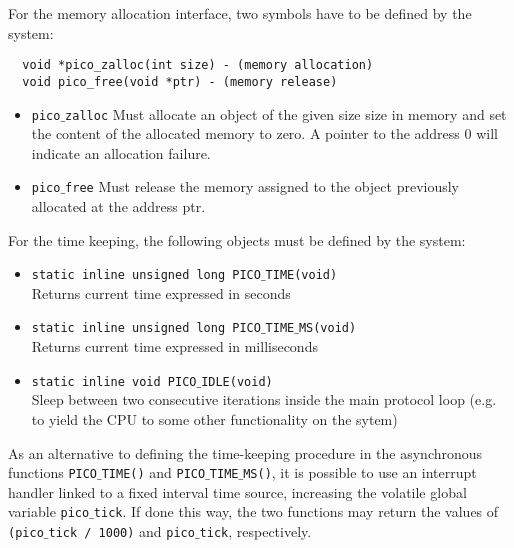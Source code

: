 For the memory allocation interface, two symbols have to be defined by the system:
\begin{verbatim}
  void *pico_zalloc(int size) - (memory allocation) 
  void pico_free(void *ptr) - (memory release)
\end{verbatim}

\begin{itemize}
\item \texttt{pico$\_$zalloc} Must allocate an object of the given size size in memory
and set the content of the allocated memory to zero. A pointer to the address 0 will
indicate an allocation failure.
\item \texttt{pico$\_$free} Must release the memory assigned to the object previously
allocated at the address ptr.
\end{itemize}


For the time keeping, the following objects must be defined by the system:
\begin{itemize}%
\item
\texttt{static inline unsigned long PICO$\_$TIME(void)}\\
Returns current time expressed in seconds

\item
\texttt{static inline unsigned long PICO$\_$TIME$\_$MS(void)}\\
Returns current time expressed in milliseconds

\item
\texttt{static inline void PICO$\_$IDLE(void)}\\
Sleep between two consecutive iterations inside the main protocol loop
(e.g. to yield the CPU to some other functionality on the sytem)
\end{itemize}

As an alternative to defining the time-keeping procedure in the asynchronous
functions \texttt{PICO$\_$TIME()} and \texttt{PICO$\_$TIME$\_$MS()}, it is possible
to use an interrupt handler linked to a fixed interval time source, increasing the
volatile global variable \texttt{pico$\_$tick}. If done this way, the two
functions may return the values of \texttt{(pico$\_$tick / 1000)} and
\texttt{pico$\_$tick}, respectively.

